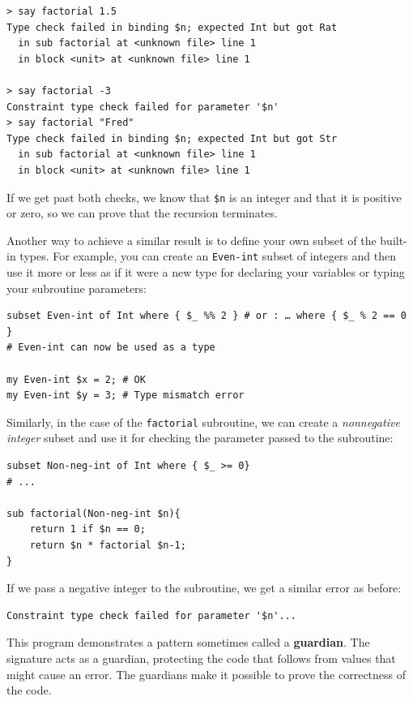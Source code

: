 \begin{verbatim}
> say factorial 1.5
Type check failed in binding $n; expected Int but got Rat
  in sub factorial at <unknown file> line 1
  in block <unit> at <unknown file> line 1

> say factorial -3
Constraint type check failed for parameter '$n'
> say factorial "Fred"
Type check failed in binding $n; expected Int but got Str
  in sub factorial at <unknown file> line 1
  in block <unit> at <unknown file> line 1
\end{verbatim}
% 
If we get past both checks, we know that \verb'$n' is an 
integer and that it is positive or zero, so we can prove 
that the recursion terminates.


Another way to achieve a similar result is to define your own 
subset of the built-in types. For example, you can create an 
{\tt Even-int} subset of integers and then use it more or less 
as if it were a new type for declaring your variables or 
typing your subroutine parameters:

\begin{verbatim}
subset Even-int of Int where { $_ %% 2 } # or : … where { $_ % 2 == 0 }
# Even-int can now be used as a type

my Even-int $x = 2; # OK
my Even-int $y = 3; # Type mismatch error
\end{verbatim}

Similarly, in the case of the {\tt factorial} subroutine, we 
can create a \emph{nonnegative integer} subset and use it 
for checking the parameter passed to the subroutine:

\begin{verbatim}
subset Non-neg-int of Int where { $_ >= 0}
# ...

sub factorial(Non-neg-int $n){
    return 1 if $n == 0;
    return $n * factorial $n-1;
}
\end{verbatim}
%
If we pass a negative integer to the subroutine, we get 
a similar error as before:

\begin{verbatim}
Constraint type check failed for parameter '$n'...
\end{verbatim}

This program demonstrates a pattern sometimes called a {\bf guardian}.
The signature acts as a guardian, protecting the code that
follows from values that might cause an error.  The guardians make it
possible to prove the correctness of the code.


